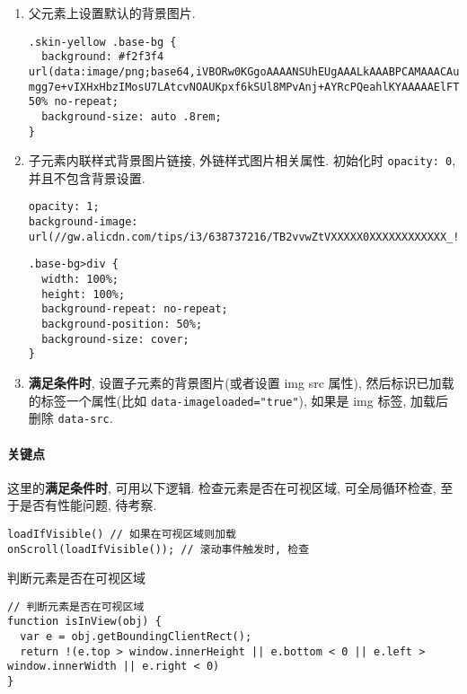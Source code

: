 \begin{enumerate}
\def\labelenumi{\arabic{enumi}.}
\item
  父元素上设置默认的背景图片.

\begin{lstlisting}
.skin-yellow .base-bg {
  background: #f2f3f4 url(data:image/png;base64,iVBORw0KGgoAAAANSUhEUgAAALkAAABPCAMAAACAuJRqAAAAq1BMV…mgg7e+vIXHxHbzIMosU7LAtcvNOAUKpxf6kSUl8MPvAnj+AYRcPQeahlKYAAAAAElFTkSuQmCC) 50% no-repeat;
  background-size: auto .8rem;
}
\end{lstlisting}
\item
  子元素内联样式背景图片链接, 外链样式图片相关属性. 初始化时
  \lstinline!opacity: 0!, 并且不包含背景设置.

\begin{lstlisting}
opacity: 1;
background-image: url(//gw.alicdn.com/tips/i3/638737216/TB2vvwZtVXXXXX0XXXXXXXXXXXX_!!638737216.jpg_400x400q75.jpg_.webp);
\end{lstlisting}

\begin{lstlisting}
.base-bg>div {
  width: 100%;
  height: 100%;
  background-repeat: no-repeat;
  background-position: 50%;
  background-size: cover;
}
\end{lstlisting}
\item
  \textbf{满足条件时}, 设置子元素的背景图片(或者设置 img src 属性),
  然后标识已加载的标签一个属性(比如
  \lstinline!data-imageloaded="true"!), 如果是 img 标签, 加载后删除
  \lstinline!data-src!.
\end{enumerate}

\paragraph{关键点}\label{ux5173ux952eux70b9}

这里的\textbf{满足条件时}, 可用以下逻辑. 检查元素是否在可视区域,
可全局循环检查, 至于是否有性能问题, 待考察.

\begin{lstlisting}
loadIfVisible() // 如果在可视区域则加载
onScroll(loadIfVisible()); // 滚动事件触发时, 检查
\end{lstlisting}

判断元素是否在可视区域

\begin{lstlisting}
// 判断元素是否在可视区域
function isInView(obj) {
  var e = obj.getBoundingClientRect();
  return !(e.top > window.innerHeight || e.bottom < 0 || e.left > window.innerWidth || e.right < 0)
}
\end{lstlisting}

